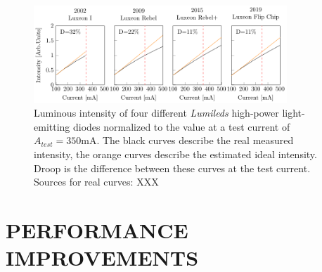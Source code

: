 \documentclass[a4paper]{spie}  %
\begin{document}
\begin{figure} [ht]
    \begin{center}
        \includegraphics[width=0.85\textwidth]{SPIE/article/droop_lumileds.pdf}
    \end{center}
    \caption{Luminous intensity of four different \textit{Lumileds} high-power light-emitting diodes normalized to the value at a test current of $A_{test}=350$mA. The black curves describe the real measured intensity, the orange curves describe the estimated ideal intensity. Droop is the difference between these curves at the test current. Sources for real curves: XXX}
    \label{fig:chip_arch}
\end{figure}

\section{PERFORMANCE IMPROVEMENTS}
\end{document}
